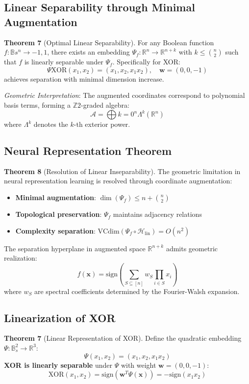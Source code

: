 \documentclass{article}
\begin{document}
\subsection{Linear Separability through Minimal Augmentation}
\textbf{Theorem 7} (Optimal Linear Separability).
For any Boolean function $f: \mathbb{B}s^n \to {-1,1}$, there exists an embedding $\Psi_f: \mathbb{R}^n \to \mathbb{R}^{n+k}$ with $k \leq \binom{n}{2}$ such that $f$ is linearly separable under $\Psi_f$. Specifically for XOR:
\begin{equation}
\Psi{\mathrm{XOR}}(x_1,x_2) = (x_1, x_2, x_1x_2), \quad \mathbf{w} = (0,0,-1)
\end{equation}
achieves separation with minimal dimension increase.

\textit{Geometric Interpretation}:
The augmented coordinates correspond to polynomial basis terms, forming a $\mathbb{Z}2$-graded algebra:
\begin{equation}
\mathcal{A} = \bigoplus{k=0}^n \Lambda^k(\mathbb{R}^n)
\end{equation}
where $\Lambda^k$ denotes the $k$-th exterior power.

\subsection{Neural Representation Theorem}
\textbf{Theorem 8} (Resolution of Linear Inseparability).
The geometric limitation in neural representation learning \cite{rumelhart1986learning} is resolved through coordinate augmentation:
\begin{itemize}
\item \textbf{Minimal augmentation}: $\dim(\Psi_f) \leq n + \binom{n}{2}$
\item \textbf{Topological preservation}: $\Psi_f$ maintains adjacency relations
\item \textbf{Complexity separation}: $\mathrm{VCdim}(\Psi_f \circ \mathcal{H}_{\mathrm{lin}}) = O(n^2)$
\end{itemize}

The separation hyperplane in augmented space $\mathbb{R}^{n+k}$ admits geometric realization:
\begin{equation}
f(\mathbf{x}) = \mathrm{sign} \left( \sum_{S \subseteq [n]} w_S \prod_{i \in S} x_i \right)
\end{equation}
where $w_S$ are spectral coefficients determined by the Fourier-Walsh expansion.

\subsection{Linearization of XOR}
\textbf{Theorem 7} (Linear Representation of XOR). \label{thm:xor}
Define the quadratic embedding $\Psi: \mathbb{B}_s^2 \to \mathbb{R}^3$:
\begin{equation}
\Psi(x_1, x_2) = (x_1,  x_2,  x_1 x_2)
\end{equation}
\textbf{XOR is linearly separable} under $\Psi$ with weight $\mathbf{w} = (0,0,-1)$:
\begin{equation}
\mathrm{XOR}(x_1, x_2) = \mathrm{sign}(\mathbf{w}^T \Psi(\mathbf{x})) = -\mathrm{sign}(x_1 x_2)
\end{equation}
\end{document}
